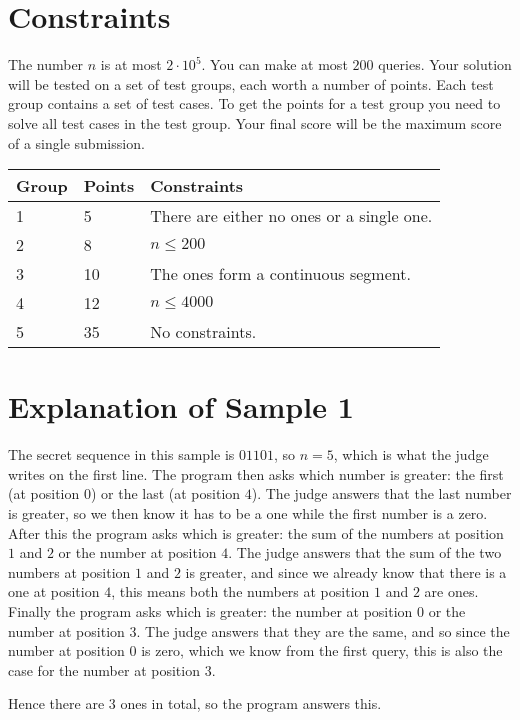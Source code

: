 \section*{Constraints}
The number $n$ is at most $2 \cdot 10^5$. You can make at most $200$ queries.
Your solution will be tested on a set of test groups, each worth a number of points.
Each test group contains a set of test cases.
To get the points for a test group you need to solve all test cases in the test group.
Your final score will be the maximum score of a single submission.

\noindent
\begin{tabular}{| l | l | l |}
\hline
Group & Points & Constraints \\ \hline
1     & 5     & There are either no ones or a single one. \\ \hline
2     & 8    & $n \leq 200$ \\ \hline
3     & 10    & The ones form a continuous segment. \\ \hline
4     & 12    & $n \leq 4000$ \\ \hline
5     & 35    & No constraints. \\ \hline
\end{tabular}

\section*{Explanation of Sample 1}
The secret sequence in this sample is $01101$, so $n = 5$, which is what the judge writes on the first line.
The program then asks which number is greater: the first (at position $0$) or the last (at position $4$).
The judge answers that the last number is greater, so we then know it has to be a one while the first number is a zero.
After this the program asks which is greater: the sum of the numbers at position $1$ and $2$ or the number at position $4$.
The judge answers that the sum of the two numbers at position $1$ and $2$ is greater, and since we already
know that there is a one at position $4$, this means both the numbers at position $1$ and $2$ are ones.
Finally the program asks which is greater: the number at position $0$ or the number at position $3$.
The judge answers that they are the same, and so since the number at position $0$ is zero, which we know
from the first query, this is also the case for the number at position $3$.

Hence there are $3$ ones in total, so the program answers this.
